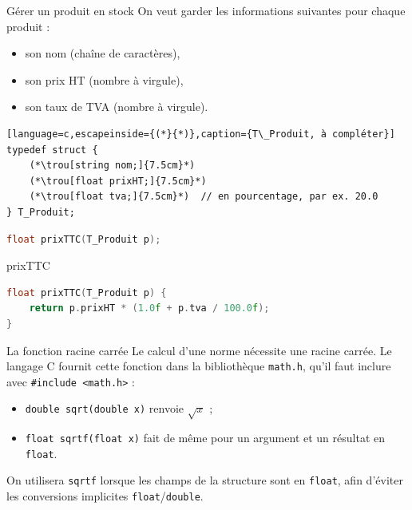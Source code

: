 
\begin{UPSTIexercice}{Gérer un produit en stock}
    On veut garder les informations suivantes pour chaque produit :
    \begin{itemize}
        \item son nom (chaîne de caractères),
        \item son prix HT (nombre à virgule),
        \item son taux de TVA (nombre à virgule).
    \end{itemize}


    \begin{lstlisting}[language=c,escapeinside={(*}{*)},caption={T\_Produit, à compléter}]
typedef struct {
    (*\trou[string nom;]{7.5cm}*)
    (*\trou[float prixHT;]{7.5cm}*)
    (*\trou[float tva;]{7.5cm}*)  // en pourcentage, par ex. 20.0
} T_Produit;
\end{lstlisting}


    \begin{lstlisting}[language=c,caption={Prototype}]
float prixTTC(T_Produit p);
\end{lstlisting}

\begin{UPSTIeleveOnlyEnv}
\end{UPSTIeleveOnlyEnv}

\begin{UPSTIcorrectionP}{prixTTC}
\begin{lstlisting}[language=c,caption={Correction}]
float prixTTC(T_Produit p) {
    return p.prixHT * (1.0f + p.tva / 100.0f);
}
\end{lstlisting}
\end{UPSTIcorrectionP}
\end{UPSTIexercice}


\begin{UPSTIinfor}{La fonction racine carrée}
    Le calcul d'une norme nécessite une racine carrée. Le langage C fournit cette fonction dans
    la bibliothèque \texttt{math.h}, qu'il faut inclure avec \texttt{\#include <math.h>} :
    \begin{itemize}
        \item \texttt{double sqrt(double x)} renvoie $\sqrt{x}$ ;
        \item \texttt{float sqrtf(float x)} fait de même pour un argument et un résultat en \texttt{float}.
    \end{itemize}
    On utilisera \texttt{sqrtf} lorsque les champs de la structure sont en \texttt{float}, afin d'éviter
    les conversions implicites \texttt{float}/\texttt{double}.
\end{UPSTIinfor}

